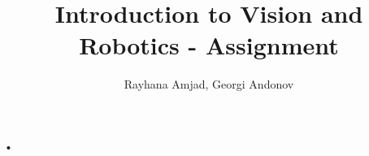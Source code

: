 \documentclass[11pt,a4paper]{article}
\author{Rayhana Amjad, Georgi Andonov}
\title{Introduction to Vision and Robotics - Assignment}
\begin{document}
•
\end{document}
